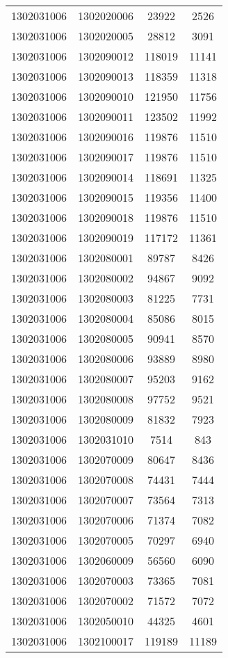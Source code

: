 \begin{longtable}[h]{llcc}
		1302031006 & 1302020006 & 23922 & 2526\\
		1302031006 & 1302020005 & 28812 & 3091\\
		1302031006 & 1302090012 & 118019 & 11141\\
		1302031006 & 1302090013 & 118359 & 11318\\
		1302031006 & 1302090010 & 121950 & 11756\\
		1302031006 & 1302090011 & 123502 & 11992\\
		1302031006 & 1302090016 & 119876 & 11510\\
		1302031006 & 1302090017 & 119876 & 11510\\
		1302031006 & 1302090014 & 118691 & 11325\\
		1302031006 & 1302090015 & 119356 & 11400\\
		1302031006 & 1302090018 & 119876 & 11510\\
		1302031006 & 1302090019 & 117172 & 11361\\
		1302031006 & 1302080001 & 89787 & 8426\\
		1302031006 & 1302080002 & 94867 & 9092\\
		1302031006 & 1302080003 & 81225 & 7731\\
		1302031006 & 1302080004 & 85086 & 8015\\
		1302031006 & 1302080005 & 90941 & 8570\\
		1302031006 & 1302080006 & 93889 & 8980\\
		1302031006 & 1302080007 & 95203 & 9162\\
		1302031006 & 1302080008 & 97752 & 9521\\
		1302031006 & 1302080009 & 81832 & 7923\\
		1302031006 & 1302031010 & 7514 & 843\\
		1302031006 & 1302070009 & 80647 & 8436\\
		1302031006 & 1302070008 & 74431 & 7444\\
		1302031006 & 1302070007 & 73564 & 7313\\
		1302031006 & 1302070006 & 71374 & 7082\\
		1302031006 & 1302070005 & 70297 & 6940\\
		1302031006 & 1302060009 & 56560 & 6090\\
		1302031006 & 1302070003 & 73365 & 7081\\
		1302031006 & 1302070002 & 71572 & 7072\\
		1302031006 & 1302050010 & 44325 & 4601\\
		1302031006 & 1302100017 & 119189 & 11189\\

\end{longtable}
